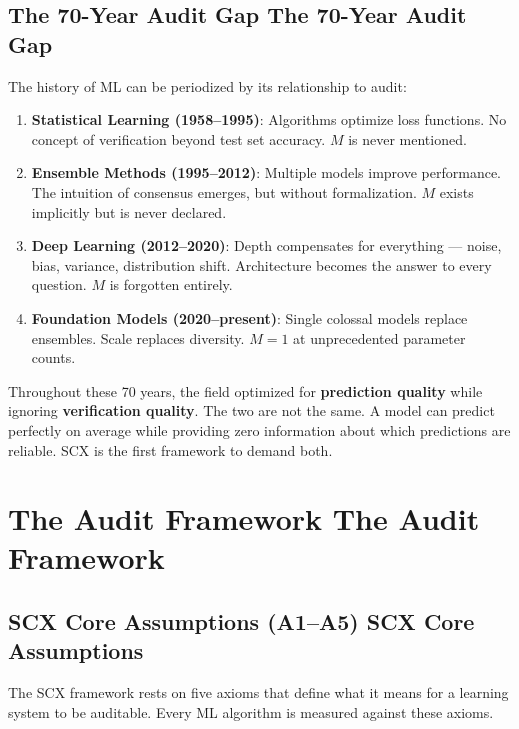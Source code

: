 \documentclass[12pt,a4paper]{article}
\theoremstyle{definition}
\newcommand{\SCX}{\textsc{SCX}}
\begin{document}
\subsection{The 70-Year Audit Gap The 70-Year Audit Gap}

The history of ML can be periodized by its relationship to audit:

\begin{enumerate}[label=\textbf{Era \arabic*:}, nosep]
    \item \textbf{Statistical Learning (1958--1995)}: Algorithms optimize loss functions. No concept of verification beyond test set accuracy. $M$ is never mentioned.
    \item \textbf{Ensemble Methods (1995--2012)}: Multiple models improve performance. The intuition of consensus emerges, but without formalization. $M$ exists implicitly but is never declared.
    \item \textbf{Deep Learning (2012--2020)}: Depth compensates for everything — noise, bias, variance, distribution shift. Architecture becomes the answer to every question. $M$ is forgotten entirely.
    \item \textbf{Foundation Models (2020--present)}: Single colossal models replace ensembles. Scale replaces diversity. $M=1$ at unprecedented parameter counts.
\end{enumerate}

Throughout these 70 years, the field optimized for \textbf{prediction quality} while ignoring \textbf{verification quality}. The two are not the same. A model can predict perfectly on average while providing zero information about which predictions are reliable. \SCX{} is the first framework to demand both.

\section{The Audit Framework The Audit Framework}
\label{sec:framework}

\subsection{SCX Core Assumptions (A1--A5) SCX Core Assumptions}

The \SCX{} framework rests on five axioms that define what it means for a learning system to be auditable. Every ML algorithm is measured against these axioms.
\end{document}
